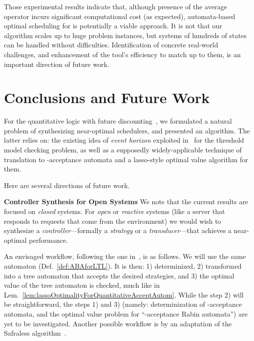 \documentclass[a4paper,USenglish,numberwithinsect]{lipics}
\theoremstyle{definition}
\theoremstyle{remark}
\theoremstyle{plain}
\begin{document}
 Those experimental results indicate that, although presence of the
 average operator  incurs significant computational cost (as
 expected), 
 automata-based optimal scheduling for
  is potentially a
 viable approach. It is not that
 our algorithm scales up to huge problem instances, but systems of
 hundreds of states can be handled without difficulties.
Identification of concrete real-world challenges,
 and enhancement of the tool's efficiency to match up to them, is an important
 direction of future work.



















\section{Conclusions and Future Work}\label{sec:conclFutureWork}
For the quantitative logic  with future
discounting~\cite{AlmagorBK14}, we formulated a natural problem of
synthesizing near-optimal schedulers,
 and presented an algorithm. The latter relies on: the existing 
idea of \emph{event horizon}  exploited in~\cite{AlmagorBK14}  for the
threshold model checking problem, as well as a supposedly widely-applicable 
technique of translation to -acceptance automata and a
lasso-style optimal value algorithm for them.

Here are several directions of future work.

\noindent
\textbf{Controller Synthesis for Open Systems}
We note that the current results are focused on \emph{closed} systems.
For \emph{open} or \emph{reactive} systems (like a server that responds
to requests that come from the environment) we would wish to synthesize a \emph{controller}---formally  a
\emph{strategy} or a \emph{transducer}---that achieves a near-optimal
performance. 

An envisaged workflow,
following the one in~\cite{Vardi96anautomata-theoretic}, is as follows. 
We will use the same automaton 
(Def.~\ref{def:ABAforLTL}). It is then: 1) determinized,
2) transformed into a tree automaton that accepts the desired strategies,
and 3) the optimal value of the tree automaton is checked, much like 
in
Lem.~\ref{lem:lassoOptimalityForQuantitativeAcceptAutom}. While the
step 2) will be straightforward, the steps 1) and 3)
(namely: determinization of -acceptance automata, and the optimal
value
problem for ``-acceptance Rabin automata'') are yet to be
investigated.
Another possible workflow is by an adaptation of the Safraless algorithm~\cite{KupfermanPV06}.
\end{document}
